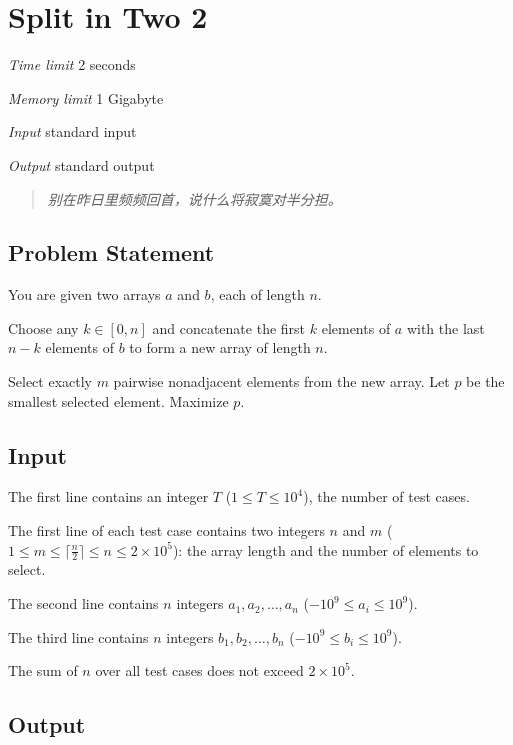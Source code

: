 \section[C. Split in Two 2]{ Split in Two 2}

\textit{Time limit}   2 seconds

\textit{Memory limit} 1 Gigabyte

\textit{Input} \qquad standard input

\textit{Output} \qquad standard output


\begin{quote}
	\textit{别在昨日里频频回首，说什么将寂寞对半分担。}
\end{quote}

\subsection{Problem Statement}

You are given two arrays $a$ and $b$, each of length $n$.

Choose any $k \in [0,n]$ and concatenate the first $k$ elements of $a$ with the last $n-k$ elements of $b$ to form a new array of length $n$.

Select exactly $m$ pairwise nonadjacent elements from the new array. Let $p$ be the smallest selected element. Maximize $p$.

\subsection{Input}

The first line contains an integer $T$ ($1 \le T \le 10^4$), the number of test cases.

The first line of each test case contains two integers $n$ and $m$ ($1 \le m \le \lceil \frac n2 \rceil \le n \le 2 \times 10^5$): the array length and the number of elements to select.

The second line contains $n$ integers $a_1,a_2,\ldots,a_n$ ($-10^9 \le a_i \le 10^9$).

The third line contains $n$ integers $b_1,b_2,\ldots,b_n$ ($-10^9 \le b_i \le 10^9$).

The sum of $n$ over all test cases does not exceed $2 \times 10^5$.

\subsection{Output}

